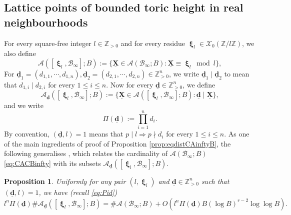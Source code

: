 \documentclass[11pt,letterpaper]{amsart}
\newcommand{\BZ}{{\mathbb {Z}}}
\newcommand{\CA}{{\mathcal {A}}}
\newcommand{\CB}{{\mathcal {B}}}
\newcommand{\CX}{{\mathcal {X}}}
\newcommand{\XX}{\underline{\mathbf{X}}}
\newcommand{\dd}{\underline{\mathbf{d}}}
\DeclareMathOperator{\bxi}{\mathbf{\xi}}
\theoremstyle{plain}
\numberwithin{equation}{section}
\newtheorem{proposition}[theorem]{Proposition}
\theoremstyle{definition}
\theoremstyle{remark}
\begin{document}
\subsection{Lattice points of bounded toric height in real neighbourhoods}
For every square-free integer $l\in\BZ_{>0}$ and for every residue $\bxi_l\in\CX_0(\BZ/l\BZ)$, we also define
\begin{equation}\label{eq:CAxilBinfty}
	\CA([\bxi_l,\CB_\infty];B):=\{\XX\in\CA(\CB_\infty;B):\XX\equiv \bxi_l\bmod l\},
\end{equation}
For $\dd_1=(d_{1,1},\cdots,d_{1,n}),\dd_2=(d_{2,1},\cdots,d_{2,n})\in\BZ_{>0}^n$, we write $\dd_1\mid \dd_2$ to mean that $d_{1,i}\mid d_{2,i}$ for every $1\leqslant i\leqslant n$.
Now for every $\dd\in\BZ_{>0}^n$, we define \begin{equation}\label{eq:CAdxilBinfty}
	\CA_{\dd}([\bxi_l,\CB_\infty];B):=\{\XX\in\CA([\bxi_l,\CB_\infty];B):\dd\mid \XX\},
\end{equation} and we write \begin{equation}\label{eq:Pid}
	\Pi(\dd):=\prod_{i=1}^{n}d_i.
\end{equation} 
By convention, $(\dd,l)=1$ means that $p\mid l\Rightarrow p\nmid d_i$ for every $1\leqslant i\leqslant n$.
As one of the main ingredients of proof of Proposition \ref{prop:eqdistCAinftyB}, the following generalises \cite[Lemma 11.26]{Salberger}, which relates the cardinality of $\CA(\CB_\infty;B)$ \eqref{eq:CACBinfty} with its subsets $\CA_{\dd}([\bxi_l,\CB_\infty];B)$.
\begin{proposition}\label{prop:CAxilBCAB}
	Uniformly for any pair $(l,\bxi_l)$ and $\dd\in\BZ_{>0}^n$ such that $(\dd,l)=1$, we have (recall \eqref{eq:Pid})
	$$l^n\Pi(\dd)\#\CA_{\dd}([\bxi_l,\CB_\infty];B)=\#\CA(\CB_\infty;B)+O(l^n\Pi(\dd) B(\log B)^{r-2}\log\log B).$$
\end{proposition}
\end{document}
